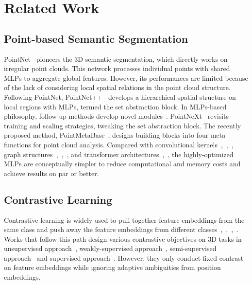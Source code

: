 \section{Related Work}
\label{sec:rw}


\subsection{Point-based Semantic Segmentation}

PointNet~\cite{qi2017pointnet} pioneers the 3D semantic segmentation, which directly works on irregular point clouds. This network processes individual points with shared MLPs to aggregate global features. However, its performances are limited because of the lack of considering local spatial relations in the point cloud structure. Following PointNet, PointNet++~\cite{qi2017pointnet++} develops a hierarchical spatial structure on local regions with MLPs, termed the set abstraction block. In MLPs-based philosophy, follow-up methods develop novel modules~\cite{zhang2024geoauxnet,liu2020closer}. PointNeXt~\cite{qian2022pointnext} revisits training and scaling strategies, tweaking the set abstraction block. The recently proposed method, PointMetaBase~\cite{lin2023meta}, designs building blocks into four meta functions for point cloud analysis. Compared with convolutional kernels~\cite{thomas2019kpconv},~\cite{xu2021paconv},~\cite{liu2020semantic}, graph structures~\cite{landrieu2018large},~\cite{qian2021pu},~\cite{tao2022seggroup}, and transformer architectures~\cite{zhao2021point},~\cite{park2022fast}, the highly-optimized MLPs are conceptually simpler to reduce computational and memory costs and achieve results on par or better.


\subsection{Contrastive Learning}

Contrastive learning is widely used to pull together feature embeddings from the same class and push away the feature embeddings from different classes~\cite{gutmann2010noise},~\cite{oord2018representation},~\cite{khosla2020supervised},~\cite{ong2023quad}. Works that follow this path design various contrastive objectives on 3D tasks in unsupervised approach~\cite{xie2020pointcontrast}, weakly-supervised approach~\cite{li2022hybridcr}, semi-supervised approach~\cite{jiang2021guided} and supervised approach~\cite{tang2022contrastive}. However, they only conduct fixed contrast on feature embeddings while ignoring adaptive ambiguities from position embeddings. 



